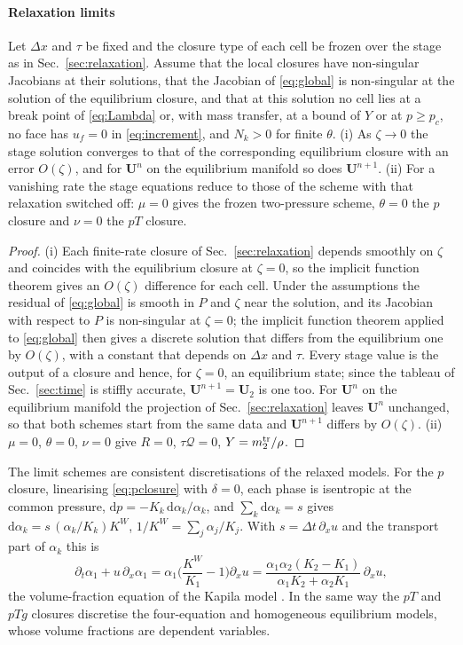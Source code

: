\paragraph{Relaxation limits}
\begin{theorem}\label{thm:limits}
Let $\Delta x$ and $\tau$ be fixed and the closure type of each cell be frozen over the stage as in Sec.~\ref{sec:relaxation}. Assume that
the local closures have non-singular Jacobians at their solutions, that the Jacobian of \eqref{eq:global} is non-singular at the
solution of the equilibrium closure, and that at this solution no cell lies at a break point of \eqref{eq:Lambda} or, with mass transfer, at a bound of $Y$
or at $p\ge p_c$, no face has $u_f=0$ in \eqref{eq:increment}, and $N_k>0$ for finite $\theta$. (i) As $\zeta\to0$ the stage solution converges to that of the
corresponding equilibrium closure with an error $O(\zeta)$, and for $\mathbf U^n$ on the equilibrium manifold so does $\mathbf U^{n+1}$.
(ii) For a vanishing rate the stage equations reduce to those of the scheme with that relaxation switched off: $\mu=0$ gives
the frozen two-pressure scheme, $\theta=0$ the $p$ closure and $\nu=0$ the $pT$ closure.
\end{theorem}
\begin{proof}
(i) Each finite-rate closure of Sec.~\ref{sec:relaxation} depends smoothly on $\zeta$ and coincides with the equilibrium
closure at $\zeta=0$, so the implicit function theorem gives an $O(\zeta)$ difference for each cell. Under the assumptions the
residual of \eqref{eq:global} is smooth in $P$ and $\zeta$ near the solution, and its Jacobian with respect to $P$ is non-singular at $\zeta=0$; the implicit function theorem applied to
\eqref{eq:global} then gives a discrete solution that differs from the equilibrium one by $O(\zeta)$, with a constant that depends on
$\Delta x$ and $\tau$. Every stage value is the output of a closure and hence,
for $\zeta=0$, an equilibrium state; since the tableau of Sec.~\ref{sec:time} is stiffly accurate, $\mathbf U^{n+1}=\mathbf U_2$ is one too. For $\mathbf U^n$ on the equilibrium manifold
the projection of Sec.~\ref{sec:relaxation} leaves $\mathbf U^n$ unchanged, so that both schemes start from the same data and $\mathbf U^{n+1}$ differs by $O(\zeta)$.
(ii) $\mu=0$, $\theta=0$, $\nu=0$ give $R=0$, $\tau\mathcal Q=0$, $Y=m^{\rm tr}_2/\rho$.
\end{proof}
The limit schemes are consistent discretisations of the relaxed models. For the $p$ closure, linearising
\eqref{eq:pclosure} with $\delta=0$, each phase is isentropic at the common pressure, $\mathrm dp=-K_k\,\mathrm d\alpha_k/\alpha_k$, and $\sum_k\mathrm d\alpha_k=s$ gives
$\mathrm d\alpha_k=s\,(\alpha_k/K_k)K^W$, $1/K^W=\sum_j\alpha_j/K_j$. With $s=\Delta t\,\partial_xu$ and the transport part of $\alpha_k$ this is
\[
\partial_t\alpha_1+u\,\partial_x\alpha_1=\alpha_1\Big(\frac{K^W}{K_1}-1\Big)\partial_xu=\frac{\alpha_1\alpha_2(K_2-K_1)}{\alpha_1K_2+\alpha_2K_1}\,\partial_xu ,
\]
the volume-fraction equation of the Kapila model \cite{Kapila2001,Pelanti2022}. In the same way the $pT$
and $pTg$ closures discretise the four-equation and homogeneous equilibrium models, whose volume fractions are dependent variables.

